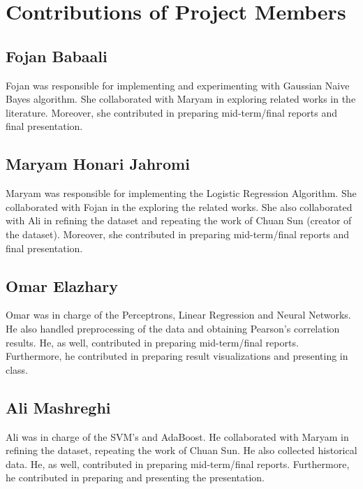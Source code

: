 \documentclass[journal,transmag]{IEEEtran}
\begin{document}
\section{Contributions of Project Members}
\subsection{Fojan Babaali}
Fojan was responsible for implementing and experimenting with Gaussian Naive Bayes algorithm. She collaborated with Maryam in exploring related works in the literature. Moreover, she contributed in preparing mid-term/final reports and final presentation.

\subsection{Maryam Honari Jahromi}
Maryam was responsible for implementing the Logistic Regression Algorithm. She collaborated with Fojan in the exploring the related works. She also collaborated with Ali in refining the dataset and repeating the work of Chuan Sun (creator of the dataset). Moreover, she contributed in preparing mid-term/final reports and final presentation.

\subsection{Omar Elazhary}
Omar was in charge of the Perceptrons, Linear Regression and Neural Networks. He also handled preprocessing of the data and obtaining Pearson's correlation results. He, as well, contributed in preparing mid-term/final reports. Furthermore, he contributed in preparing result visualizations and presenting in class.

\subsection{Ali Mashreghi}
Ali was in charge of the SVM's and AdaBoost. He collaborated with Maryam in refining the dataset, repeating the work of Chuan Sun. He also collected historical data. He, as well, contributed in preparing mid-term/final reports. Furthermore, he contributed in preparing and presenting the presentation.	
	
\end{document}
